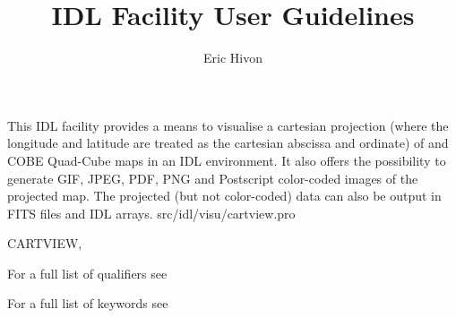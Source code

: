 




\sloppy



\title{\healpix IDL Facility User Guidelines}
 \section[cartview]{ }
\label{idl:\thedocid}
\author{Eric Hivon}



\begin{facility}
{This IDL facility provides a means to visualise a cartesian projection 
(where the longitude and latitude are treated as the cartesian abscissa and
ordinate) of
\healpix and COBE Quad-Cube maps in an IDL environment. 
It also offers the possibility to
generate GIF, JPEG, PDF, PNG and Postscript color-coded images of the projected map.
The projected (but not color-coded) data can also be output in FITS files and
IDL arrays.}
{src/idl/visu/cartview.pro}
\end{facility}

\begin{IDLformat}
{CARTVIEW, 
\normalsize{
}
}
\end{IDLformat}

\begin{qualifiers}
  \begin{qulist}{} %
\item [{\  }] For a full list of qualifiers see 
  \end{qulist}
\end{qualifiers}

\begin{keywords}
  \begin{kwlist}{} %
\item [{\  }] For a full list of keywords see 
  \end{kwlist}
\end{keywords}

